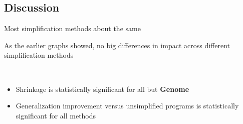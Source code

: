 \documentclass{beamer}
\begin{document}
\subsection{Discussion}

\begin{frame}{Most simplification methods about the same}

As the earlier graphs showed, no big differences in impact across different simplification methods

~

\begin{itemize}
	\item Shrinkage is statistically significant for all but \textbf{Genome}
	\item Generalization improvement versus unsimplified programs is statistically significant for all methods
\end{itemize}


\end{frame}
\end{document}
